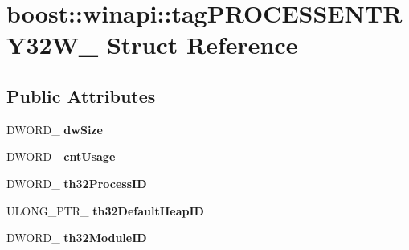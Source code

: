 \hypertarget{structboost_1_1winapi_1_1tag_p_r_o_c_e_s_s_e_n_t_r_y32_w__}{}\section{boost\+:\+:winapi\+:\+:tag\+P\+R\+O\+C\+E\+S\+S\+E\+N\+T\+R\+Y32\+W\+\_\+ Struct Reference}
\label{structboost_1_1winapi_1_1tag_p_r_o_c_e_s_s_e_n_t_r_y32_w__}
\subsection*{Public Attributes}
\begin{DoxyCompactItemize}
\item 
\mbox{\label{structboost_1_1winapi_1_1tag_p_r_o_c_e_s_s_e_n_t_r_y32_w___a7395a33f264c05be95c5520abfa27a7f}} 
D\+W\+O\+R\+D\+\_\+ {\bfseries dw\+Size}
\item 
\mbox{\label{structboost_1_1winapi_1_1tag_p_r_o_c_e_s_s_e_n_t_r_y32_w___ab36819d475e21b6f957a205e87043078}} 
D\+W\+O\+R\+D\+\_\+ {\bfseries cnt\+Usage}
\item 
\mbox{\label{structboost_1_1winapi_1_1tag_p_r_o_c_e_s_s_e_n_t_r_y32_w___a27a95d97a2dfb5cff70e6b792832af99}} 
D\+W\+O\+R\+D\+\_\+ {\bfseries th32\+Process\+ID}
\item 
\mbox{\label{structboost_1_1winapi_1_1tag_p_r_o_c_e_s_s_e_n_t_r_y32_w___a73542c5eef34f36065323cd997c0ee40}} 
U\+L\+O\+N\+G\+\_\+\+P\+T\+R\+\_\+ {\bfseries th32\+Default\+Heap\+ID}
\item 
\mbox{\label{structboost_1_1winapi_1_1tag_p_r_o_c_e_s_s_e_n_t_r_y32_w___a185f2b842e9ccf687fbd74a6b6d2fb2d}} 
D\+W\+O\+R\+D\+\_\+ {\bfseries th32\+Module\+ID}
\item 
\mbox{\label{structboost_1_1winapi_1_1tag_p_r_o_c_e_s_s_e_n_t_r_y32_w___ac4b75ac7da97185f44fdaa0305456ec7}} 

\end{DoxyCompactItemize}
